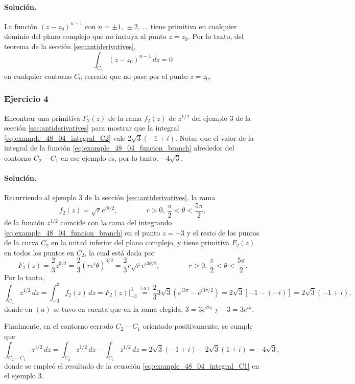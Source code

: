 \documentclass[a4paper]{report}
\begin{document}
\paragraph{Solución.} La función \((z-z_0)^{n-1}\) con \(n=\pm1,\,\pm2,\,\dots\) tiene primitiva en cualquier dominio del plano complejo que no incluya al punto \(z=z_0\). Por lo tanto, del teorema de la sección \ref{sec:antiderivatives},
\[
 \int_{C_0}(z-z_0)^{n-1}\,dz=0
\]
en cualquier contorno \(C_0\) cerrado que no pase por el punto \(z=z_0\).

\subsubsection*{Ejercicio 4}

Encontrar una primitiva \(F_2(z)\) de la rama \(f_2(z)\) de \(z^{1/2}\) del ejemplo 3 de la sección \ref{sec:antiderivatives} para mostrar que la integral \ref{eq:example_48_04_integral_C2} vale \(2\sqrt{3}(-1+i)\). Notar que el valor de la integral de la función \ref{eq:example_48_04_funcion_branch} alrededor del contorno \(C_2-C_1\) en ese ejemplo es, por lo tanto, \(-4\sqrt{3}\).

\paragraph{Solución.} Recurriendo al ejemplo 3 de la sección \ref{sec:antiderivatives}, la rama 
\[
 f_2(z)=\sqrt{r}e^{i\theta/2},
 \qquad\qquad
 r>0,\,\frac{\pi}{2}<\theta<\frac{5\pi}{2},
\]
de la función \(z^{1/2}\) coincide con la rama del integrando \ref{eq:example_48_04_funcion_branch} en el punto \(z=-3\) y el resto de los puntos de la curva \(C_2\) en la mitad inferior del plano complejo, y tiene primitiva \(F_2(z)\) en todos los puntos en \(C_2\), la cual está dada por 
\[
 F_2(z)=\frac{2}{3}z^{3/2}=\frac{2}{3}(re^i\theta)^{3/2}=\frac{2}{3}r\sqrt{r}e^{i3\theta/2},
 \qquad\qquad
 r>0,\,\frac{\pi}{2}<\theta<\frac{5\pi}{2}.
\]
Por lo tanto, 
\[
 \int_{C_2}z^{1/2}\,dz=\int_{-3}^3f_2(z)\,dz=F_2(z)\bigg|_{-3}^3\overset{(a)}{=}\frac{2}{3}3\sqrt{3}\left(e^{i3\pi}-e^{i3\pi/2}\right)=2\sqrt{3}\left[-1-(-i)\right]=2\sqrt{3}(-1+i),
\]
donde en \((a)\) se tuvo en cuenta que en la rama elegida, \(3=3e^{i2\pi}\) y \(-3=3e^{i\pi}\).

Finalmente, en el contorno cerrado \(C_2-C_1\) orientado positivamente, se cumple que 
\[
 \int_{C_2-C_1}z^{1/2}\,dz=\int_{C_2}z^{1/2}\,dz-\int_{C_1}z^{1/2}\,dz=2\sqrt{3}(-1+i)-2\sqrt{3}(1+i)=-4\sqrt{3},
\]
donde se empleó el resultado de la ecuación \ref{eq:example_48_04_integral_C1} en el ejemplo 3.
\end{document}
